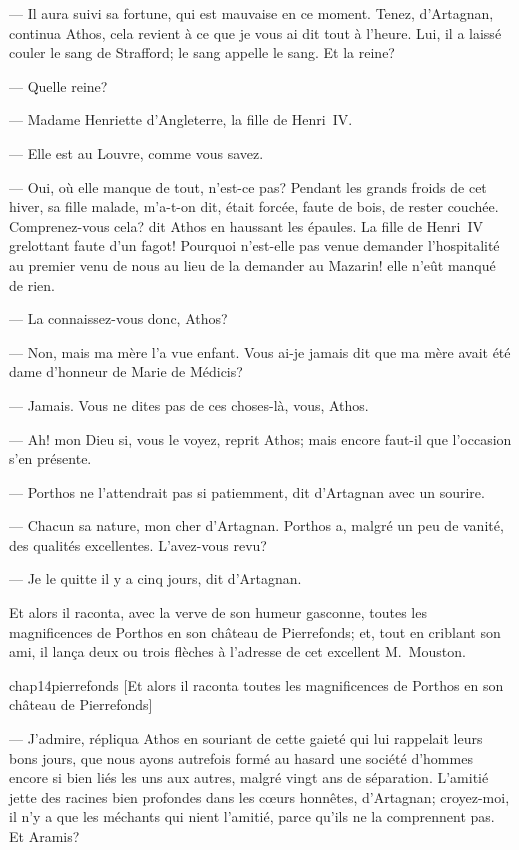 — Il aura suivi sa fortune, qui est mauvaise en ce moment. Tenez, d'Artagnan, continua Athos, cela revient à ce que je vous ai dit tout à l'heure. Lui, il a laissé couler le sang de Strafford; le sang appelle le sang. Et la reine?

— Quelle reine?

— Madame Henriette d'Angleterre, la fille de Henri~IV.

— Elle est au Louvre, comme vous savez.

— Oui, où elle manque de tout, n'est-ce pas? Pendant les grands froids de cet hiver, sa fille malade, m'a-t-on dit, était forcée, faute de bois, de rester couchée. Comprenez-vous cela? dit Athos en haussant les épaules. La fille de Henri~IV grelottant faute d'un fagot! Pourquoi n'est-elle pas venue demander l'hospitalité au premier venu de nous au lieu de la demander au Mazarin! elle n'eût manqué de rien.

— La connaissez-vous donc, Athos?

— Non, mais ma mère l'a vue enfant. Vous ai-je jamais dit que ma mère avait été dame d'honneur de Marie de Médicis?

— Jamais. Vous ne dites pas de ces choses-là, vous, Athos.

— Ah! mon Dieu si, vous le voyez, reprit Athos; mais encore faut-il que l'occasion s'en présente.

— Porthos ne l'attendrait pas si patiemment, dit d'Artagnan avec un sourire.

— Chacun sa nature, mon cher d'Artagnan. Porthos a, malgré un peu de vanité, des qualités excellentes. L'avez-vous revu?

— Je le quitte il y a cinq jours, dit d'Artagnan.

Et alors il raconta, avec la verve de son humeur gasconne, toutes les magnificences de Porthos en son château de Pierrefonds; et, tout en criblant son ami, il lança deux ou trois flèches à l'adresse de cet excellent M.~Mouston.

\begin{bwbigpic}
	[\basicscale] 
	{chap14pierrefonds}
	[Et alors il raconta toutes les magnificences de Porthos en son château de Pierrefonds]
\end{bwbigpic}

— J'admire, répliqua Athos en souriant de cette gaieté qui lui rappelait leurs bons jours, que nous ayons autrefois formé au hasard une société d'hommes encore si bien liés les uns aux autres, malgré vingt ans de séparation. L'amitié jette des racines bien profondes dans les cœurs honnêtes, d'Artagnan; croyez-moi, il n'y a que les méchants qui nient l'amitié, parce qu'ils ne la comprennent pas. Et Aramis?

